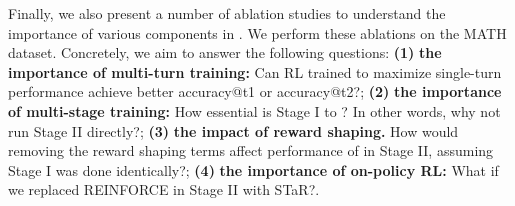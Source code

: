 \begin{table}[t]
\centering
\renewcommand{\arraystretch}{1.1}
\caption{\footnotesize{\textbf{Ablation studies to understand the impact of various components in \methodname{}.} Observe that while single-turn training is effective at optimizing the first-attempt accuracy of the model, it leads to degradation in the second attempt. The performance improvements without Stage I or without reward shaping in \methodname{} are small when measured by the difference in accuracy over the two attempts. Utilizing STaR generally leads to worse performance even when it is run from an effective Stage I checkpoint.}}
\vspace{-0.2cm}
\label{tab:math_ablations}
\vspace{-0.1cm}
\end{table}
Finally, we also present a number of ablation studies to understand the importance of various components in \methodname{}. We perform these ablations on the MATH dataset. Concretely, we aim to answer the following questions: \textbf{(1)} \textbf{the importance of multi-turn training:} Can RL trained to maximize single-turn performance achieve better accuracy@t1 or accuracy@t2?; \textbf{(2)} \textbf{the importance of multi-stage training:} How essential is Stage I to \methodname{}? In other words, why not run Stage II directly?; \textbf{(3)} \textbf{the impact of reward shaping.} How would removing the reward shaping terms affect performance of \methodname{} in Stage II, assuming Stage I was done identically?; \textbf{(4)} \textbf{the importance of on-policy RL:} What if we replaced REINFORCE in Stage II with STaR?.

